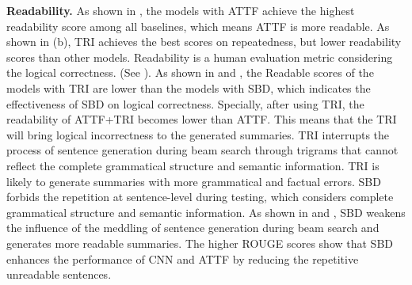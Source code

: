 	\begin{table}[th!]
		\begin{center}
			\caption{Correlation Evaluation ($\mathbf{r}$=pearson, $\mathbf{\rho}$=spearman and $\mathbf{\tau}$= kendall's tau)}
			\qquad
			\label{tab:eval_repcor}
		\end{center}
	\end{table}
\textbf{Readability.}
As shown in , 
the models with ATTF achieve the
highest readability score among all baselines, 
which means ATTF is more readable.
As shown in (b),
TRI achieves the best scores on repeatedness, 
but lower readability scores than other models.
Readability is a human evaluation metric considering the logical correctness.
(See ). 
As shown in  and , the Readable scores of the models with TRI are lower than the models with SBD, which indicates the effectiveness of SBD on logical correctness. Specially, after using TRI, the readability of ATTF+TRI becomes lower than ATTF. 
This means that the TRI will bring logical incorrectness
 to the generated summaries.
TRI interrupts the process of sentence generation during beam search through trigrams that cannot reflect the complete grammatical structure and semantic information. 
TRI is likely to generate summaries with more grammatical and factual errors. 
SBD forbids the repetition at sentence-level during testing, which considers complete grammatical structure and semantic information.
As shown in  and , SBD weakens the influence of the meddling of sentence generation during beam search
and generates more readable summaries.
The higher ROUGE scores show that SBD enhances the performance of CNN and ATTF by reducing the repetitive unreadable sentences. 




